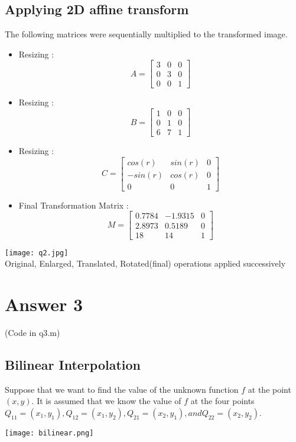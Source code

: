 \documentclass[10pt]{article}
\begin{document}
\subsection{Applying 2D affine transform}
The following matrices were sequentially multiplied to the transformed image.
\begin{itemize}
\item Resizing :\\
\[
A=
  \begin{bmatrix}
    3 & 0 & 0 \\
    0 & 3 & 0 \\
    0 & 0 & 1
  \end{bmatrix}
\]
\item Resizing :\\
\[
B=
  \begin{bmatrix}
    1 & 0 & 0 \\
    0 & 1 & 0 \\
    6 & 7 & 1
  \end{bmatrix}
\]
\item Resizing :\\
\[
C=
  \begin{bmatrix}
    cos(r) & sin(r) & 0\\
    -sin(r) & cos(r) & 0\\
    0 & 0 & 1
  \end{bmatrix}
\]
\item
Final Transformation Matrix :\\
\[
M=
  \begin{bmatrix}
    0.7784 & -1.9315 & 0\\
    2.8973 & 0.5189 & 0\\
    18 & 14 & 1
  \end{bmatrix}
\]
\end{itemize}
\begin{center}
\texttt{[image: q2.jpg]}\\Original, Enlarged, Translated, Rotated(final) operations applied successively
\end{center}

\section{Answer 3}
(Code in q3.m)\\
\subsection{Bilinear Interpolation}
Suppose that we want to find the value of the unknown function $f$ at the point $(x, y)$. It is assumed that we know the value of $f$ at the four points $Q_{11} = (x_1, y_1), Q_{12} = (x_1, y_2), Q_{21} = (x_2, y_1), and Q_{22} = (x_2, y_2)$.
\begin{center}
\texttt{[image: bilinear.png]}\\
\end{center}
\end{document}
